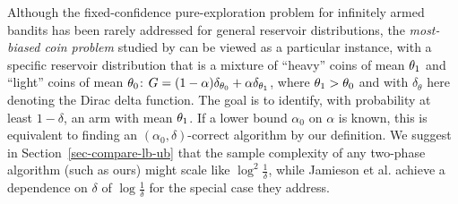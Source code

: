 Although the fixed-confidence pure-exploration problem for infinitely armed 
bandits has been rarely addressed
for general reservoir distributions, the \emph{most-biased
coin problem} studied by \cite{chandrasekaran2014finding,
jamieson2016power} can be viewed as a particular
instance, with a specific reservoir distribution that is a mixture of
``heavy'' coins of mean $\theta_1$ and ``light'' coins
of mean $\theta_0$: $G = (1-\alpha)\delta_{\theta_0} + \alpha
\delta_{\theta_1}$, where $\theta_1 > \theta_0$
and with $\delta_\theta$ here denoting the Dirac delta function. The goal is to
identify, with probability at least $1-\delta$, an arm with mean
$\theta_1$. If a lower bound $\alpha_0$ on $\alpha$ is known, this
is equivalent to finding an $(\alpha_0,\delta)$-correct algorithm
by our definition.
We suggest in Section~\ref{sec-compare-lb-ub} that the
sample complexity of any two-phase algorithm (such as ours) might scale like $\log^2 \frac{1}{\delta}$, while Jamieson et al. achieve
a dependence on $\delta$ of $\log \frac{1}{\delta}$ for the special case they address.

